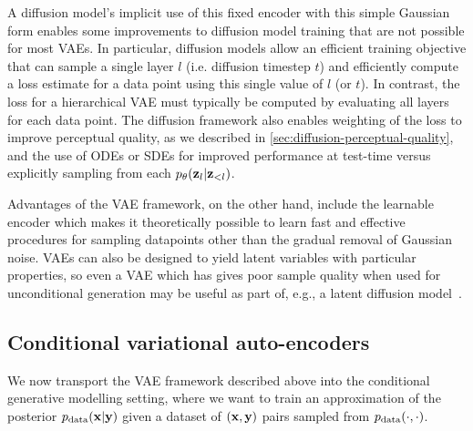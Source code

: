 A diffusion model's implicit use of this fixed encoder with this simple Gaussian form
enables some improvements to diffusion model training that are not possible for most VAEs. In particular, diffusion models allow an efficient training objective that can sample a single layer $l$ (i.e. diffusion timestep $t$) and efficiently compute a loss estimate for a data point using this single value of $l$ (or $t$). In contrast, the loss for a hierarchical VAE must typically be computed by evaluating all layers for each data point. The diffusion framework also enables weighting of the loss to improve perceptual quality, as we described in \cref{sec:diffusion-perceptual-quality}, and the use of ODEs or SDEs for improved performance at test-time versus explicitly sampling from each $p_\theta({\mathbf{z}}_l|{\mathbf{z}}_{<l})$.

Advantages of the VAE framework, on the other hand, include the learnable encoder which makes it theoretically possible to learn fast and effective procedures for sampling datapoints other than the gradual removal of Gaussian noise. VAEs can also be designed to yield latent variables with particular properties, so even a VAE which has gives poor sample quality when used for unconditional generation may be useful as part of, e.g., a latent diffusion model~\citep{rombach2022high,brooks2024video}.



\subsection{Conditional variational auto-encoders}
\label{sec:conditional-vae}
We now transport the VAE framework described above into the conditional generative modelling setting, where we want to train an approximation of the posterior $p_{\rm{data}}({\mathbf{x}}|{\mathbf{y}})$ given a dataset of $({\mathbf{x}}, {\mathbf{y}})$ pairs sampled from $p_{\rm{data}}(\cdot,\cdot)$.

